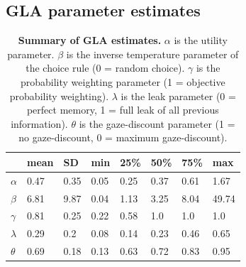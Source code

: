 \documentclass[11pt, a4paper]{article}
\begin{document}
\subsection*{GLA parameter estimates}
\begin{table}[h!]
\begin{centering}
\begin{tabular}{@{}llllllll@{}}
\toprule
       & mean & SD   & min  & 25\% & 50\% & 75\% & max   \\ \midrule
$\alpha$  & 0.47 & 0.35 & 0.05 & 0.25 & 0.37 & 0.61 & 1.67  \\
$\beta$   & 6.81 & 9.87 & 0.04 & 1.13 & 3.25 & 8.04 & 49.74 \\
$\gamma$  & 0.81 & 0.25 & 0.22 & 0.58 & 1.0  & 1.0  & 1.0   \\
$\lambda$ & 0.29 & 0.2  & 0.08 & 0.14 & 0.23 & 0.46 & 0.65  \\
$\theta$  & 0.69 & 0.18 & 0.13 & 0.63 & 0.72 & 0.83 & 0.95  \\ \bottomrule
\end{tabular}
\caption{\textbf{Summary of GLA estimates.} $\alpha$ is the utility parameter. $\beta$ is the inverse temperature parameter of the choice rule (0 = random choice). $\gamma$ is the probability weighting parameter (1 = objective probability weighting). $\lambda$ is the leak parameter (0 = perfect memory, 1 = full leak of all previous information). $\theta$ is the gaze-discount parameter (1 = no gaze-discount, 0 = maximum gaze-discount).}
\label{tab:gla-estimates}
\end{centering}
\end{table}
\clearpage
\end{document}
